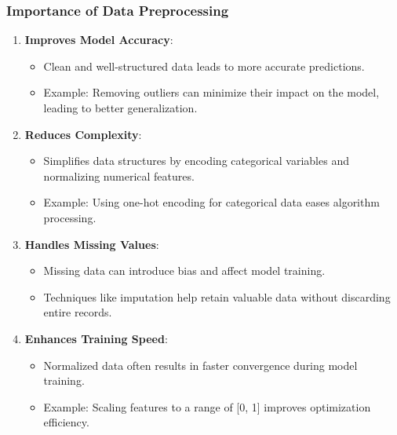 \documentclass[aspectratio=169]{beamer}
\begin{document}
\begin{frame}[fragile]
    \frametitle{Importance of Data Preprocessing}
    \begin{enumerate}
        \item \textbf{Improves Model Accuracy}:
        \begin{itemize}
            \item Clean and well-structured data leads to more accurate predictions.
            \item Example: Removing outliers can minimize their impact on the model, leading to better generalization.
        \end{itemize}
        
        \item \textbf{Reduces Complexity}:
        \begin{itemize}
            \item Simplifies data structures by encoding categorical variables and normalizing numerical features.
            \item Example: Using one-hot encoding for categorical data eases algorithm processing.
        \end{itemize}
        
        \item \textbf{Handles Missing Values}:
        \begin{itemize}
            \item Missing data can introduce bias and affect model training.
            \item Techniques like imputation help retain valuable data without discarding entire records.
        \end{itemize}
        
        \item \textbf{Enhances Training Speed}:
        \begin{itemize}
            \item Normalized data often results in faster convergence during model training.
            \item Example: Scaling features to a range of [0, 1] improves optimization efficiency.
        \end{itemize}
    \end{enumerate}
\end{frame}
\end{document}
